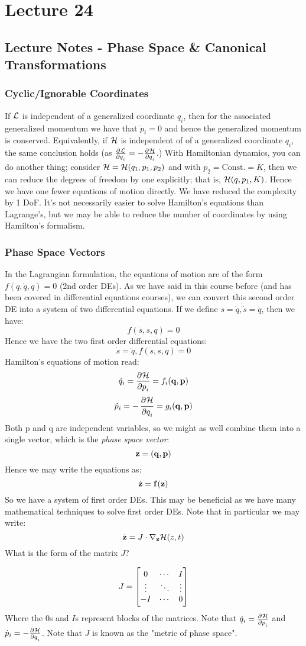 \documentclass[../PHYS306Notes.tex]{subfiles}
\begin{document}
\section{Lecture 24}
\subsection{Lecture Notes - Phase Space \& Canonical Transformations}
\subsubsection{Cyclic/Ignorable Coordinates}
If $\mathcal{L}$ is independent of a generalized coordinate $q_i$, then for the associated generalized momentum we have that $\dot{p}_i = 0$ and hence the generalized momentum is conserved. Equivalently, if $\mathcal{H}$ is independent of of a generalized coordinate $q_i$, the same conclusion holds (as $\pd{\LL}{q_i} = -\pd{\HH}{q_i}$.) With Hamiltonian dynamics, you can do another thing; consider $\mathcal{H} = \mathcal{H}(q_1, p_1, p_2)$ and with $p_2 = \text{Const.} = K$, then we can reduce the degrees of freedom by one explicitly; that is, $\mathcal{H}(q, p_1, K)$. Hence we have one fewer equations of motion directly. We have reduced the complexity by 1 DoF. It's not necessarily easier to solve Hamilton's equations than Lagrange's, but we may be able to reduce the number of coordinates by using Hamilton's formalism.

\subsubsection{Phase Space Vectors}
In the Lagrangian formulation, the equations of motion are of the form $f(\ddot{q}, \dot{q}, q) = 0$ (2nd order DEs). As we have said in this course before (and has been covered in differential equations courses), we can convert this second order DE into a system of two differential equations. If we define $s = \dot{q}, \dot{s} = \ddot{q}$, then we have:
\[f(\dot{s}, s, q) = 0\]
Hence we have the two first order differential equations:
\[\dot{s} = \ddot{q}, f(\dot{s}, s, q) = 0\]
Hamilton's equations of motion read:
\[\dot{q}_i = \dpd{\HH}{p_i} = f_i(\v{q}, \v{p})\]
\[\dot{p}_i = -\dpd{\HH}{q_i} = g_i(\v{q}, \v{p})\]
Both p and q are independent variables, so we might as well combine them into a single vector, which is the \textit{phase space vector}:
\[\mathbf{z} = (\mathbf{q}, \mathbf{p})\]
Hence we may write the equations as:
\[\dot{\mathbf{z}} = \mathbf{f}(\mathbf{z})\]
So we have a system of first order DEs. This may be beneficial as we have many mathematical techniques to solve first order DEs. Note that in particular we may write:
\[\dot{\mathbf{z}} = J \cdot \nabla_{\mathbf{z}}\mathcal{H}(z, t)\]
What is the form of the matrix $J$?
\begin{s}
\[J = \begin{bmatrix}0 & \cdots & I \\ \vdots & \ddots & \vdots \\ -I & \cdots & 0\end{bmatrix}\]
Where the $0$s and $I$s represent blocks of the matrices. Note that $\dot{q}_i = \pd{\HH}{p_i}$ and $\dot{p}_i = - \pd{\HH}{q_i}$. Note that $J$ is known as the "metric of phase space". 
\end{s}
\end{document}
